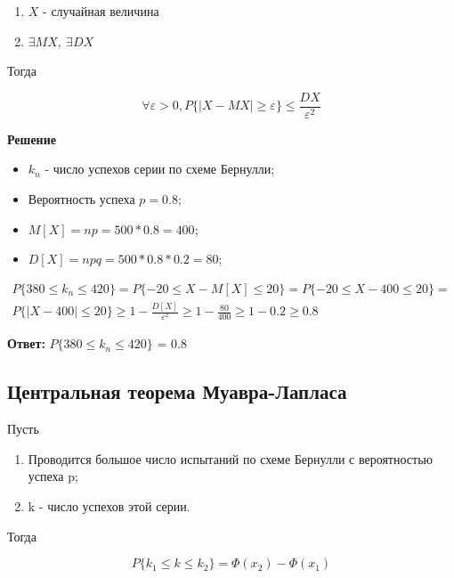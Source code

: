 \documentclass[12pt, a4paper]{report}
\begin{document}
	\begin{enumerate}
		\item $X$ - случайная величина
		\item $\exists MX,\ \exists DX$
	\end{enumerate}

	Тогда
	
	\begin{equation*}
	\forall \varepsilon > 0, P\{ |X - MX| \geq \varepsilon \} \le \frac{DX}{\varepsilon^2}
	\end{equation*}
	
	
	
	\textbf{Решение}
	
	\begin{itemize}
		\item $k_n$  - число успехов серии по схеме Бернулли;
		\item Вероятность успеха $p = 0.8$;
		\item $M[X] = np = 500 * 0.8 = 400$;
		\item $D[X] = npq = 500 * 0.8 * 0.2 = 80$;
	\end{itemize}


	\begin{multline*}
	P \{ 380 \le k_n \le 420 \} = P \{ -20 \le X - M[X] \le 20 \} = P \{ -20 \le X - 400 \le 20 \} = \\
    P \{ |X - 400| \le 20 \} \geq 1 - \frac{D[X]}{\varepsilon^2} \geq 1 - \frac{80}{400} \geq 1 - 0.2 \geq 0.8
	\end{multline*}
	
	\vspace{0.5cm}
	\textbf{Ответ:}
	$P \{ 380 \le k_n \le 420 \}$ = 0.8
	
	
	\vspace{0.5cm}\subsection{Центральная теорема Муавра-Лапласа}
	
	\hspace{0.6cm}Пусть
	
	\begin{enumerate}
		\item Проводится большое число испытаний по схеме Бернулли с вероятностью успеха p;
		\item k - число успехов этой серии.
	\end{enumerate}

	Тогда
	
	\begin{equation*}
	P\{ k_1 \le k \le k_2 \} = \Phi(x_2) - \Phi(x_1)
	\end{equation*}
	
\end{document}

